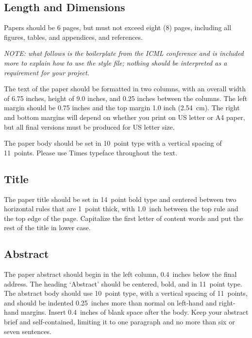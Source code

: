 \documentclass{article}
\begin{document}
\subsection{Length and Dimensions}

Papers should be 6 pages, but must not exceed eight (8) pages, including all figures, tables,
and appendices, and references.

{\em \noindent NOTE: what follows is the boilerplate from the ICML conference and is included more to explain how to use the style file; nothing should be
interpreted as a requirement for your project.}

The text of the paper should be formatted in two columns, with an
overall width of 6.75 inches, height of 9.0 inches, and 0.25 inches
between the columns. The left margin should be 0.75 inches and the top
margin 1.0 inch (2.54~cm). The right and bottom margins will depend on
whether you print on US letter or A4 paper, but all final versions
must be produced for US letter size.

The paper body should be set in 10~point type with a vertical spacing
of 11~points. Please use Times  typeface throughout the text.

\subsection{Title}

The paper title should be set in 14~point bold type and centered
between two horizontal rules that are 1~point thick, with 1.0~inch
between the top rule and the top edge of the page. Capitalize the
first letter of content words and put the rest of the title in lower
case.


\subsection{Abstract}

The paper abstract should begin in the left column, 0.4~inches below
the final address. The heading `Abstract' should be centered, bold,
and in 11~point type. The abstract body should use 10~point type, with
a vertical spacing of 11~points, and should be indented 0.25~inches
more than normal on left-hand and right-hand margins. Insert
0.4~inches of blank space after the body. Keep your abstract brief and
self-contained,
limiting it to one paragraph and no more than six or seven sentences.
\end{document}
